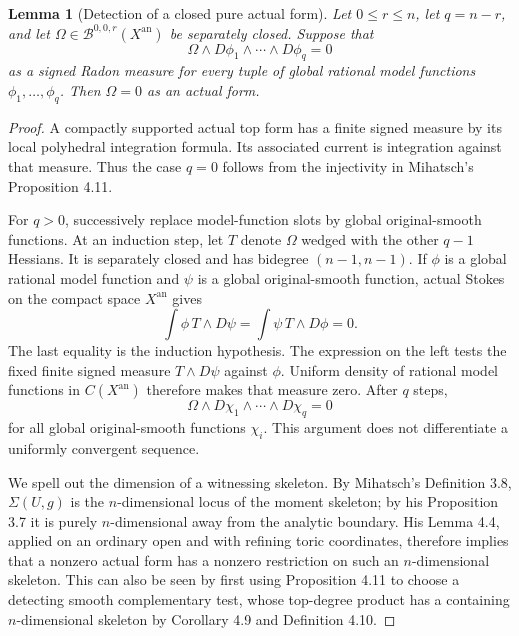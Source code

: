 \documentclass[11pt,a4paper]{article}
\newtheorem{lemma}[theorem]{Lemma}
\theoremstyle{definition}
\theoremstyle{remark}
\begin{document}
\begin{lemma}[Detection of a closed pure actual form]
\label{h22c:detector}
Let $0\le r\le n$, let $q=n-r$, and let
$\Omega\in\mathcal B^{0,0,r}(X^{\mathrm{an}})$ be separately closed.
Suppose that
\[
                 \Omega\wedge D\phi_1\wedge\cdots\wedge D\phi_q=0
\]
as a signed Radon measure for every tuple of global rational model
functions $\phi_1,\ldots,\phi_q$.  Then $\Omega=0$ as an actual form.
\end{lemma}

\begin{proof}
A compactly supported actual top form has a finite signed measure by
its local polyhedral integration formula.  Its associated current is
integration against that measure.  Thus the case $q=0$ follows from
the injectivity in Mihatsch's Proposition 4.11.

For $q>0$, successively replace model-function slots by global
original-smooth functions.  At an induction step, let $T$ denote
$\Omega$ wedged with the other $q-1$ Hessians.  It is separately
closed and has bidegree $(n-1,n-1)$.  If $\phi$ is a global rational
model function and $\psi$ is a global original-smooth function,
actual Stokes on the compact space $X^{\mathrm{an}}$ gives
\[
                  \int\phi\,T\wedge D\psi
                    =\int\psi\,T\wedge D\phi=0.
\]
The last equality is the induction hypothesis.  The expression on
the left tests the fixed finite signed measure $T\wedge D\psi$
against $\phi$.  Uniform density of rational model functions in
$C(X^{\mathrm{an}})$ therefore makes that measure zero.  After $q$
steps,
\[
                  \Omega\wedge D\chi_1\wedge\cdots\wedge D\chi_q=0
\tag{H22.C1}\label{h22c:all-smooth-hessians}
\]
for all global original-smooth functions $\chi_i$.  This argument
does not differentiate a uniformly convergent sequence.

We spell out the dimension of a witnessing skeleton.  By Mihatsch's
Definition 3.8, $\Sigma(U,g)$ is the $n$-dimensional locus of the
moment skeleton; by his Proposition 3.7 it is purely
$n$-dimensional away from the analytic boundary.  His Lemma 4.4,
applied on an ordinary open and with refining toric coordinates,
therefore implies that a nonzero actual form has a nonzero restriction
on such an $n$-dimensional skeleton.  This can also be seen by first
using Proposition 4.11 to choose a detecting smooth complementary
test, whose top-degree product has a containing $n$-dimensional
skeleton by Corollary 4.9 and Definition 4.10.


\end{proof}
\end{document}
